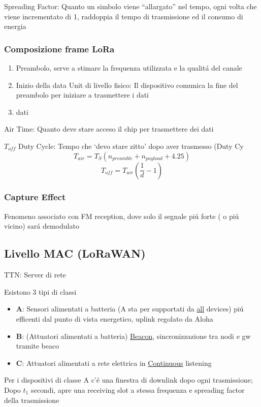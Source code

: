 \documentclass{article}
\begin{document}
Spreading Factor: Quanto un simbolo viene ``allargato'' nel tempo, ogni volta che viene incrementato di 1, raddoppia il tempo di trasmissione ed il consumo di energia

\subsubsection{Composizione frame LoRa}
\begin{enumerate}
    \item Preambolo, serve a stimare la frequenza utilizzata e la qualit\'a del canale
    \item  Inizio della data Unit di livello fisico: Il dispositivo comunica la fine del preambolo per iniziare a trasmettere i dati
    \item  dati
\end{enumerate}

Air Time: Quanto deve stare acceso il chip per trasmettere dei dati

$T_{off}$ Duty Cycle: Tempo che `devo stare zitto' dopo aver trasmesso (Duty Cy
\[ T_{air} = T_S (n_{preamble} + n_{payload} + 4.25 )\]
\[ T_{off} = T_{air} \left( \frac{1}{d} -1 \right) \]

\subsubsection{Capture Effect}
Fenomeno associato con FM reception, dove solo il segnale pi\'u forte ( o pi\'u vicino) sar\'a demodulato

\subsection{Livello MAC (LoRaWAN)}
TTN: Server di rete

Esistono 3 tipi di classi
\begin{itemize}
    \item \textbf{A}: Sensori alimentati a batteria (A sta per supportati da \underline{all} devices) pi\'u efficenti dal punto di vista energetico, uplink regolato da Aloha
    \item \textbf{B}: (Attuatori alimentati a batteria) \underline{Beacon}, sincronizzazione tra nodi e gw tramite beaco
    \item \textbf{C}: Attuatori alimentati a rete elettrica in \underline{Continuous} listening
\end{itemize}

Per i dispositivi di classe A c'\'e una finestra di downlink dopo ogni trasmissione; Dopo $t_1$ secondi, apre una receiving slot a stessa frequenza e spreading factor della trasmissione
\end{document}
